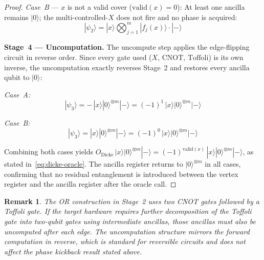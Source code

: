 \documentclass{ieeeaccess}
\newenvironment{prf}{\begin{proof}}{\end{proof}}
\newtheorem{rem}{Remark}
\begin{document}
\begin{prf}
\smallskip
\noindent\textit{Case~B} --- $x$ is not a valid cover
($\mathrm{valid}(x) = 0$): At least one ancilla remains
$|0\rangle$; the multi-controlled-$X$ does not fire and no
phase is acquired:
\begin{equation}
    |\psi_2\rangle
    = |x\rangle \bigotimes_{j=1}^{m}|f_j(x)\rangle
    \cdot |-\rangle
    \label{eq:dicke-psi2-invalid}
\end{equation}

\medskip
\noindent\textbf{Stage~4 --- Uncomputation.}
The uncompute step applies the edge-flipping circuit in
reverse order. Since every gate used ($X$, $\mathrm{CNOT}$,
$\mathrm{Toffoli}$) is its own inverse, the uncomputation
exactly reverses Stage~2 and restores every ancilla qubit
to $|0\rangle$:

\smallskip
\noindent\textit{Case~A:}
\begin{equation}
    |\psi_3\rangle
    = -\,|x\rangle|0\rangle^{\otimes m}|-\rangle
    = (-1)^{1}\,|x\rangle|0\rangle^{\otimes m}|-\rangle
    \label{eq:dicke-psi3-valid}
\end{equation}

\noindent\textit{Case~B:}
\begin{equation}
    |\psi_3\rangle
    = |x\rangle|0\rangle^{\otimes m}|-\rangle
    = (-1)^{0}\,|x\rangle|0\rangle^{\otimes m}|-\rangle
    \label{eq:dicke-psi3-invalid}
\end{equation}

\noindent
Combining both cases yields
$O_{\mathrm{Dicke}}\,|x\rangle|0\rangle^{\otimes m}|-\rangle
= (-1)^{\mathrm{valid}(x)}\,
|x\rangle|0\rangle^{\otimes m}|-\rangle$,
as stated in~\eqref{eq:dicke-oracle}. The ancilla register
returns to $|0\rangle^{\otimes m}$ in all cases, confirming
that no residual entanglement is introduced between the
vertex register and the ancilla register after the oracle
call.
\end{prf}

\begin{rem}
\label{rem:or-decomposition}
The OR construction in Stage~2 uses two CNOT gates followed
by a Toffoli gate. If the target hardware requires further
decomposition of the Toffoli gate into two-qubit gates using
intermediate ancillas, those ancillas must also be
uncomputed after each edge. The uncomputation structure
mirrors the forward computation in reverse, which is
standard for reversible circuits and does not affect the
phase kickback result stated above.
\end{rem}
\end{document}
